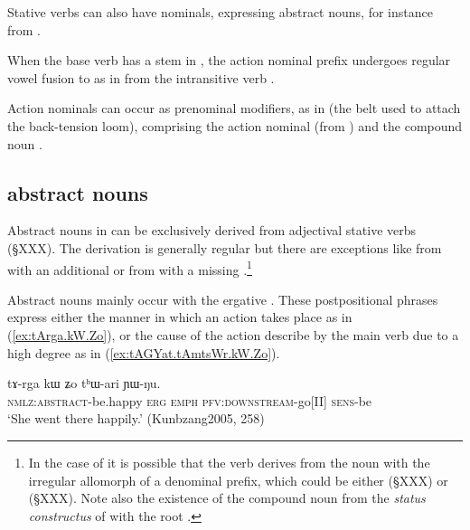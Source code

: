 Stative verbs can also have  nominals, expressing abstract nouns, for instance  from .

When the base verb has a stem in , the action nominal prefix  undergoes regular vowel fusion  to  as in  from the intransitive verb .

Action nominals can occur as prenominal modifiers, as in  (the belt used to attach  the back-tension loom), comprising the action nominal  (from ) and the compound noun .

\subsection{ abstract nouns} \label{sec:tA.abstract.nouns}
Abstract nouns in  can be exclusively derived from adjectival stative verbs (§XXX). The derivation is generally regular but there are exceptions like  from  with an additional  or   from  with a missing .\footnote{In the case of  it is possible that the verb  derives from the noun with the irregular allomorph of a denominal prefix, which could be either  (§XXX) or  (§XXX). Note also the existence of the compound noun  from the \textit{status constructus} of  with the root . }

Abstract nouns mainly occur with the ergative . These postpositional phrases express either the manner in which an action takes place as in (\ref{ex:tArga.kW.Zo}), or  the cause of the action describe by the main verb due to a high degree as in (\ref{ex:tAGYat.tAmtsWr.kW.Zo}). 


\begin{exe}
\ex \label{ex:tArga.kW.Zo}
\gll  tɤ-rga kɯ ʑo tʰɯ-ari ɲɯ-ŋu. \\
\textsc{nmlz}:\textsc{abstract}-be.happy \textsc{erg} \textsc{emph} \textsc{pfv}:\textsc{downstream}-go[II] \textsc{sens}-be \\
\glt  `She went there happily.' (Kunbzang2005, 258)
\end{exe}

